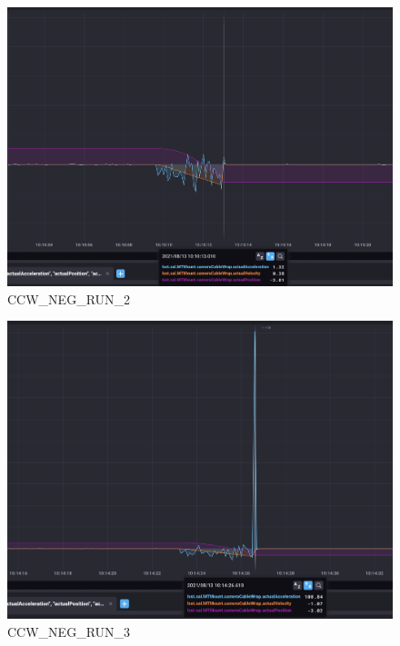 \documentclass[SE,authoryear,toc, lsstdraft]{lsstdoc}
\begin{document}
\begin{figure}
  \includegraphics[width=\linewidth]{media/ccw_neg_2.png}
  \caption{CCW\_NEG\_RUN\_2}
  \label{fig:CCW_NEG_RUN_2}
\end{figure}

\begin{figure}
  \includegraphics[width=\linewidth]{media/ccw_neg_3.png}
  \caption{CCW\_NEG\_RUN\_3}
  \label{fig:CCW_NEG_RUN_3}
\end{figure}
\end{document}
